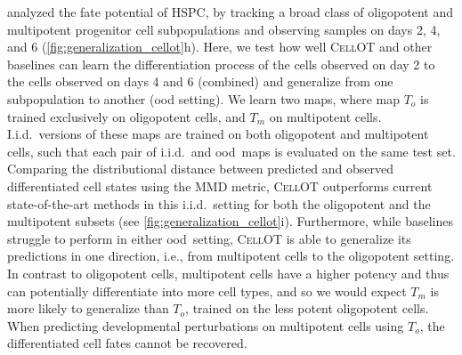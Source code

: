 \citet{weinreb2020lineage} analyzed the fate potential of \acrfull{HSPC}, by tracking a broad class of oligopotent %
and multipotent %
 progenitor cell subpopulations and observing samples on days 2, 4, and 6 (\cref{fig:generalization_cellot}h).
Here, we test how well \textsc{CellOT} and other baselines can learn the differentiation process of the cells observed on day 2 to the cells observed on days 4 and 6 (combined) and generalize from one subpopulation to another (\acrshort{ood} setting).
We learn two maps, where map $T_o$ is trained exclusively on oligopotent cells, and $T_m$ on multipotent cells.
I.i.d.~versions of these maps are trained on both oligopotent and multipotent cells, such that each pair of i.i.d.~and \acrshort{ood}~maps is evaluated on the same test set.
Comparing the distributional distance between predicted and observed differentiated cell states using the \acrshort{MMD} metric, \textsc{CellOT} outperforms current state-of-the-art methods in this i.i.d.~setting for both the oligopotent and the multipotent subsets (see \cref{fig:generalization_cellot}i).
Furthermore, while baselines struggle to perform in either \acrshort{ood}~setting, \textsc{CellOT} is able to generalize its predictions in one direction, i.e., from multipotent cells to the oligopotent setting.
In contrast to oligopotent cells, multipotent cells have a higher potency and thus can potentially differentiate into more cell types, and so we would expect $T_m$ is more likely to generalize than $T_o$, trained on the less potent oligopotent cells.
When predicting developmental perturbations on multipotent cells using $T_o$, the differentiated cell fates cannot be recovered.

